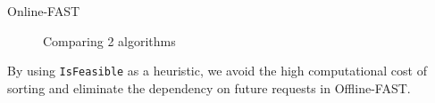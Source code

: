 

\begin{frame}{Online-FAST}
\begin{figure}[H]
  \centering
  \hspace{0.2in} %
   \caption{Comparing 2 algorithms}
\end{figure}

By using \texttt{IsFeasible} as a heuristic, we avoid the high computational cost of sorting and eliminate the dependency on future requests in Offline-FAST.
 
\end{frame}
